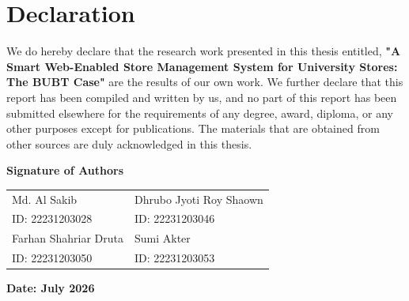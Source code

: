\chapter*{Declaration}

We do hereby declare that the research work presented in this thesis entitled, \textbf{"A Smart Web-Enabled Store Management System for University Stores: The BUBT Case"} are the results of our own work. We further declare that this report has been compiled and written by us, and no part of this report has been submitted elsewhere for the requirements of any degree, award, diploma, or any other purposes except for publications. The materials that are obtained from other sources are duly acknowledged in this thesis.

\vfill

\begin{center}
\textbf{Signature of Authors}
\end{center}

\vspace{1cm}

\begin{tabular}{p{3in} p{3in}}
Md. Al Sakib & Dhrubo Jyoti Roy Shaown\\
ID: 22231203028 & ID: 22231203046\\[2cm]
Farhan Shahriar Druta & Sumi Akter\\
ID: 22231203050 & ID: 22231203053\\
\end{tabular}

\vspace{1cm}

\begin{center}
\textbf{Date: July 2026}
\end{center}